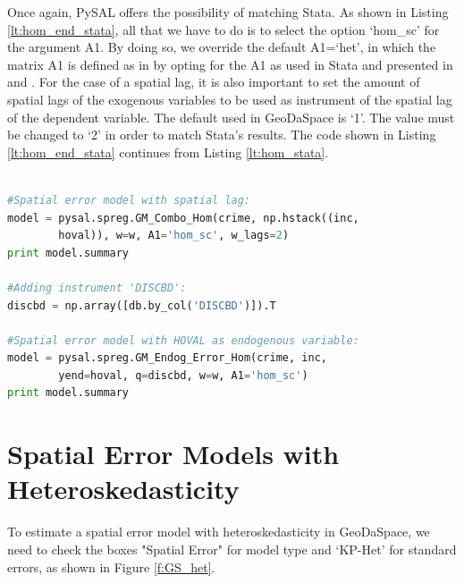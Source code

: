 \documentclass{article}
\begin{document}
Once again, PySAL offers the possibility of matching Stata. As shown in Listing \ref{lt:hom_end_stata}, all that we have to do is to select the option `hom\_sc' for the argument A1. By doing so, we override the default A1=`het', in which the matrix A1 is defined as in \citet{Arraiz10} by opting for the A1 as used in Stata and presented in \citet{Drukker10} and \citet{Drukker11}. For the case of a spatial lag, it is also important to set the amount of spatial lags of the exogenous variables to be used as instrument of the spatial lag of the dependent variable. The default used in GeoDaSpace is `1'. The value must be changed to `2' in order to match Stata's results. The code shown in Listing \ref{lt:hom_end_stata} continues from Listing \ref{lt:hom_stata}.

\begin{code}
\begin{lstlisting}[label=lt:hom_end_stata,caption=Using PySAL to match the results of spatial error models with endogenous variables or spatial lag from Stata,language=Python]

#Spatial error model with spatial lag:
model = pysal.spreg.GM_Combo_Hom(crime, np.hstack((inc,
        hoval)), w=w, A1='hom_sc', w_lags=2)
print model.summary

#Adding instrument 'DISCBD':
discbd = np.array([db.by_col('DISCBD')]).T

#Spatial error model with HOVAL as endogenous variable:
model = pysal.spreg.GM_Endog_Error_Hom(crime, inc,
        yend=hoval, q=discbd, w=w, A1='hom_sc')
print model.summary

\end{lstlisting}
\end{code}

\section{Spatial Error Models with Heteroskedasticity}
To estimate a spatial error model with heteroskedasticity in GeoDaSpace, we need to check the boxes "Spatial Error" for model type and `KP-Het' for standard errors, as shown in Figure \ref{f:GS_het}.
\end{document}
